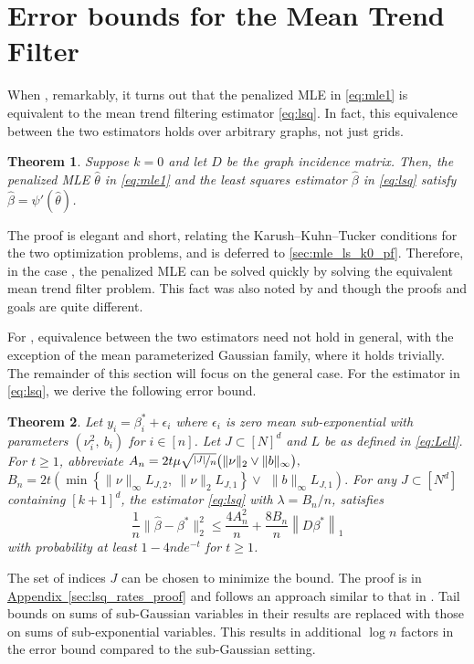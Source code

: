 \documentclass[ejs,noshowframe]{imsart}
\theoremstyle{plain}
\newtheorem{theorem}{Theorem}[section]
\theoremstyle{definition}
\newcommand{\aref}[1]{\hyperref[#1]{Appendix~\ref*{#1}}}
\newcommand{\norm}[1]{\left\lVert #1 \right\rVert}
\newcommand{\snorm}[1]{\lVert #1 \rVert}
\renewcommand{\hat}{\widehat}
\begin{document}
\section{Error bounds for the Mean Trend Filter}
\label{sec:theory_mean_tf}

When , remarkably, it turns out that the penalized MLE in
\eqref{eq:mle1} is  
equivalent to the mean trend filtering estimator \eqref{eq:lsq}.
 In fact, this equivalence between the two 
estimators holds over arbitrary graphs, not just
grids.
\begin{theorem}
	\label{thm:mle_ls_k0}
	Suppose $k=0$ and let $D$ be the graph incidence matrix. Then, the penalized
  MLE $\hat\theta$ in \eqref{eq:mle1} and the least squares  
	estimator $\hat\beta$ in \eqref{eq:lsq} satisfy $\hat \beta = \psi' (\hat\theta)$.
\end{theorem}

The proof is elegant and short, relating the Karush--Kuhn--Tucker 
conditions for the two optimization problems, and is deferred to \autoref{sec:mle_ls_k0_pf}.
Therefore, in the case ,
the penalized MLE can be solved quickly by solving the equivalent mean trend 
filter problem. This fact was also noted by \citet{Vu2018} and \citet{DumbgenKovac2009} though
the proofs and goals are quite different.


For , equivalence between the two estimators need not hold in 
general, with the exception of the mean parameterized Gaussian family, where it holds
trivially. The remainder of this section will focus on the general case.
For the estimator in \eqref{eq:lsq}, we derive the following error bound.

\begin{theorem}
\label{thm:lsq_rates}
Let $y_i = \beta^*_i + \epsilon_i$ where $\epsilon_i$ is zero mean
sub-exponential with parameters $(\nu_i^2,\ b_i)$ for $i\in [n]$.  
Let $J \subset [N]^d$ and $L$ be as defined in \eqref{eq:Lell}.
For $t\geq 1$, abbreviate
$A_n = 2t\mu \sqrt{\nicefrac{|J|}{n}} \big( \| \nu \|_2 \vee 
\|b\|_\infty\big),$
$B_n = 2t\left( 
	\min\left\{ \|\nu\|_\infty  L_{J,2},\ \|\nu\|_2 L_{J,1} \right\} \vee\right.$
$\left.\| b \|_\infty L_{J,1}\right).$
For any $J \subset [N^d]$ containing $[k+1]^d$, the estimator \eqref{eq:lsq} 
with
$\lambda =  B_n / n$, satisfies 
\begin{equation}
\frac{1}{n}\snorm{ \hat\beta - \beta^* }_2^2 
\leq \frac{4A_n^2}{n} +
\frac{8B_n}{n} \norm{ D \beta^*}_1
\end{equation}
with probability at least $1-4nd e^{-t}$ for $t\geq 1$. 
\end{theorem}
The set of indices $J$ can be chosen to minimize the bound.
The proof is in \aref{sec:lsq_rates_proof} and follows an approach similar to
that in 
\cite{WangSharpnack2016}.
Tail bounds on sums of sub-Gaussian variables in their results are replaced 
with those on sums 
of sub-exponential variables. This results in additional $\log n$ factors
 in the error bound compared to the sub-Gaussian setting.
\end{document}

